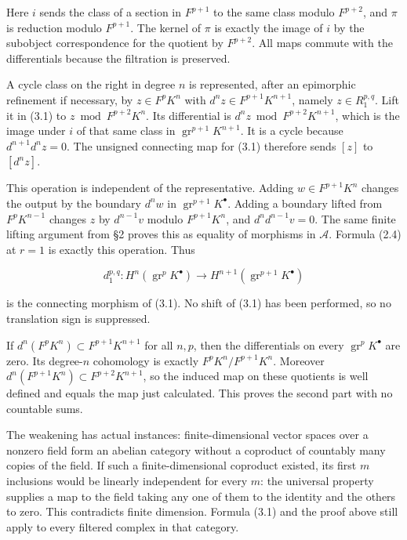 \documentclass[11pt]{article}
\begin{document}
Here \(i\) sends the class of a section in \(F^{p+1}\) to the same class modulo \(F^{p+2}\), and \(\pi\) is reduction modulo \(F^{p+1}\). The kernel of \(\pi\) is exactly the image of \(i\) by the subobject correspondence for the quotient by \(F^{p+2}\). All maps commute with the differentials because the filtration is preserved.

A cycle class on the right in degree \(n\) is represented, after an epimorphic refinement if necessary, by \(z\in F^pK^n\) with \(d^nz\in F^{p+1}K^{n+1}\), namely \(z\in R_1^{p,q}\). Lift it in (3.1) to \(z\bmod F^{p+2}K^n\). Its differential is \(d^nz\bmod F^{p+2}K^{n+1}\), which is the image under \(i\) of that same class in \(\operatorname{gr}^{p+1}K^{n+1}\). It is a cycle because \(d^{n+1}d^nz=0\). The unsigned connecting map for (3.1) therefore sends \([z]\) to \([d^nz]\).

This operation is independent of the representative. Adding \(w\in F^{p+1}K^n\) changes the output by the boundary \(d^nw\) in \(\operatorname{gr}^{p+1}K^\bullet\). Adding a boundary lifted from \(F^pK^{n-1}\) changes \(z\) by \(d^{n-1}v\) modulo \(F^{p+1}K^n\), and \(d^nd^{n-1}v=0\). The same finite lifting argument from §2 proves this as equality of morphisms in \(\mathcal A\). Formula (2.4) at \(r=1\) is exactly this operation. Thus

\[
d_1^{p,q}:H^n(\operatorname{gr}^pK^\bullet)
\longrightarrow H^{n+1}(\operatorname{gr}^{p+1}K^\bullet)
\]

is the connecting morphism of (3.1). No shift of (3.1) has been performed, so no translation sign is suppressed.

If \(d^n(F^pK^n)\subset F^{p+1}K^{n+1}\) for all \(n,p\), then the differentials on every \(\operatorname{gr}^pK^\bullet\) are zero. Its degree-\(n\) cohomology is exactly \(F^pK^n/F^{p+1}K^n\). Moreover \(d^n(F^{p+1}K^n)\subset F^{p+2}K^{n+1}\), so the induced map on these quotients is well defined and equals the map just calculated. This proves the second part with no countable sums.

The weakening has actual instances: finite-dimensional vector spaces over a nonzero field form an abelian category without a coproduct of countably many copies of the field. If such a finite-dimensional coproduct existed, its first \(m\) inclusions would be linearly independent for every \(m\): the universal property supplies a map to the field taking any one of them to the identity and the others to zero. This contradicts finite dimension. Formula (3.1) and the proof above still apply to every filtered complex in that category.
\end{document}
